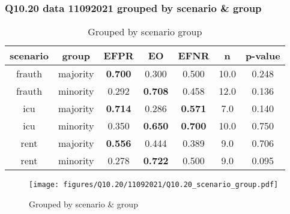 \subsubsection{Q10.20 data 11092021 grouped by scenario \& group}

\begin{comment}
                        EFPR        EO      EFNR     n    pvalue
(frauth, majority)  0.700000  0.300000  0.500000  10.0  0.247561
(frauth, minority)  0.291667  0.708333  0.458333  12.0  0.136180
(icu, majority)     0.714286  0.285714  0.571429   7.0  0.139712
(icu, minority)     0.350000  0.650000  0.700000  10.0  0.750316
(rent, majority)    0.555556  0.444444  0.388889   9.0  0.705735
(rent, minority)    0.277778  0.722222  0.500000   9.0  0.094671
\end{comment}

\begin{table}[h]
    \centering
    \begin{tabular}{|c|c|c|c|c|c|c|}
        \hline
        scenario & group & EFPR & EO & EFNR & n & p-value\\
        \hline
        frauth & majority & \textbf{0.700} & 0.300 & 0.500 & 10.0 & 0.248\\
		frauth & minority & 0.292 & \textbf{0.708} & 0.458 & 12.0 & 0.136\\
		icu & majority & \textbf{0.714} & 0.286 & \textbf{0.571} & 7.0 & 0.140\\
		icu & minority & 0.350 & \textbf{0.650} & \textbf{0.700} & 10.0 & 0.750\\
		rent & majority & \textbf{0.556} & 0.444 & 0.389 & 9.0 & 0.706\\
		rent & minority & 0.278 & \textbf{0.722} & 0.500 & 9.0 & 0.095\\
		
        \hline
    \end{tabular}
    \caption{Grouped by scenario group}
    \label{tab:my_label}
\end{table}
\begin{figure}[h]
    \centering
    \texttt{[image: figures/Q10.20/11092021/Q10.20\_scenario\_group.pdf]}
    \caption{Grouped by scenario \& group}
    \label{fig:my_label}
\end{figure}

